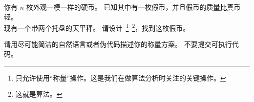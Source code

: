 
\begin{problem}[$n$ 枚硬币]

  你有 $n$ 枚外观一模一样的硬币。
  已知其中有一枚假币，并且假币的质量比真币轻。\\
  现有一个带两个托盘的天平秤。
  请设计~\footnote{只允许使用``称量''操作。这是我们在做算法分析时关注的关键操作。}~\footnote{这就是算法。}，找到这枚假币。

  请用尽可能简洁的自然语言或者伪代码描述你的称量方案。
  不要提交可执行代码。
\end{problem}

\begin{solution}
\end{solution}

